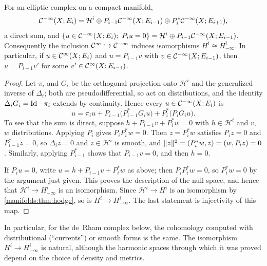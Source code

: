 \begin{proposition}\label{manifolds:prop:hodge-distributional}
For an elliptic complex on a compact manifold,
\begin{equation}\label{manifolds:eq:hodge-distributional}
\mathcal{C}^{-\infty}(X;E_i)=\mathcal H^i\oplus P_{i-1}\mathcal{C}^{-\infty}(X;E_{i-1})\oplus P_i^*\mathcal{C}^{-\infty}(X;E_{i+1}),
\end{equation}
a direct sum, and $\{u\in\mathcal{C}^{-\infty}(X;E_i);\ P_iu=0\}=\mathcal H^i\oplus P_{i-1}\mathcal{C}^{-\infty}(X;E_{i-1})$.
Consequently the inclusion $\mathcal{C}^\infty\hookrightarrow\mathcal{C}^{-\infty}$ induces isomorphisms
$H^i\cong H^i_{-\infty}$. In particular, if $u\in\mathcal{C}^\infty(X;E_i)$ and $u=P_{i-1}v$ with
$v\in\mathcal{C}^{-\infty}(X;E_{i-1})$, then $u=P_{i-1}v'$ for some $v'\in\mathcal{C}^\infty(X;E_{i-1})$.
\end{proposition}
\begin{proof}
Let $\pi_i$ and $G_i$ be the orthogonal projection onto $\mathcal H^i$ and the
generalized inverse of $\Delta_i$; both are pseudodifferential, so act on
distributions, and the identity $\Delta_iG_i=\operatorname{Id}-\pi_i$ extends by continuity. Hence
every $u\in\mathcal{C}^{-\infty}(X;E_i)$ is
\begin{equation*}
u=\pi_iu+P_{i-1}\big(P_{i-1}^*G_iu\big)+P_i^*\big(P_iG_iu\big).
\end{equation*}
To see that the sum is direct, suppose $h+P_{i-1}v+P_i^*w=0$ with $h\in\mathcal H^i$ and $v$, $w$
distributions. Applying $P_i$ gives $P_iP_i^*w=0$. Then $z=P_i^*w$ satisfies $P_iz=0$
and $P_{i-1}^*z=0$, so $\Delta_iz=0$ and $z\in\mathcal H^i$ is smooth, and
$\|z\|^2=( P_i^*w, z)=( w, P_iz)=0$. Similarly, applying $P_{i-1}^*$ shows that
$P_{i-1}v=0$, and then $h=0$.

If $P_iu=0$, write $u=h+P_{i-1}v+P_i^*w$ as above; then $P_iP_i^*w=0$, so $P_i^*w=0$ by the
argument just given. This proves the description of the null space, and hence
that $\mathcal H^i\to H^i_{-\infty}$ is an isomorphism. Since $\mathcal H^i\to H^i$ is an isomorphism
by \cref{manifolds:thm:hodge}, so is $H^i\to H^i_{-\infty}$. The last statement is
injectivity of this map.
\end{proof}

In particular, for the de~Rham complex below, the cohomology computed with
distributional (``currents'') or smooth forms is the same. The isomorphism
$H^i\to H^i_{-\infty}$ is natural, although the harmonic spaces through which it was
proved depend on the choice of density and metrics.

